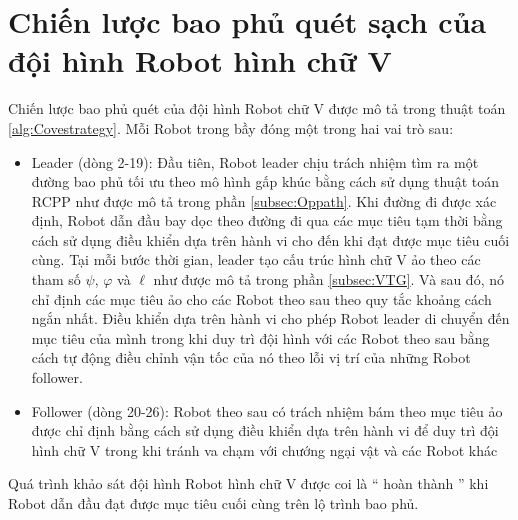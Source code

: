 \section{Chiến lược bao phủ quét sạch của đội hình Robot hình chữ V}
Chiến lược bao phủ quét của đội hình Robot chữ V được mô tả trong thuật toán \ref{alg:Covestrategy}. Mỗi Robot trong bầy đóng một trong hai vai trò sau:
\begin{itemize}
     \item Leader (dòng 2-19): Đầu tiên, Robot leader chịu trách nhiệm tìm ra một đường bao phủ tối ưu theo mô hình gấp khúc bằng cách sử dụng thuật toán RCPP như được mô tả trong phần \ref{subsec:Oppath}. Khi đường đi được xác định, Robot dẫn đầu bay dọc theo đường đi qua các mục tiêu tạm thời bằng cách sử dụng điều khiển dựa trên hành vi cho đến khi đạt được mục tiêu cuối cùng. Tại mỗi bước thời gian, leader tạo cấu trúc hình chữ V ảo theo các tham số $\psi$, $\varphi$ và $\ell$ như được mô tả trong phần \ref{subsec:VTG}. Và sau đó, nó chỉ định các mục tiêu ảo cho các Robot theo sau theo quy tắc khoảng cách ngắn nhất. Điều khiển dựa trên hành vi cho phép Robot leader di chuyển đến mục tiêu của mình trong khi duy trì đội hình với các Robot theo sau bằng cách tự động điều chỉnh vận tốc của nó theo lỗi vị trí của những Robot follower.
     \item Follower (dòng 20-26): Robot theo sau có trách nhiệm bám theo mục tiêu ảo được chỉ định bằng cách sử dụng điều khiển dựa trên hành vi để duy trì đội hình chữ V trong khi tránh va chạm với chướng ngại vật và các Robot khác
\end{itemize}

Quá trình khảo sát đội hình Robot hình chữ V được coi là `` hoàn thành '' khi Robot dẫn đầu đạt được mục tiêu cuối cùng trên lộ trình bao phủ.


